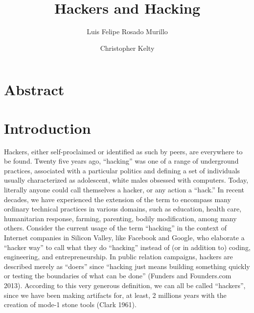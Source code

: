 \documentclass[10pt,letter,oneside]{scrartcl}
\author[1]{Luis Felipe Rosado Murillo}
\author[2]{Christopher Kelty}
\affil[1]{Berkman Center for Internet and Society, Harvard University}
\affil[2]{Institute for Society and Genetics,
          Department of Anthropology, and Department of Information Studies, UCLA}
\title{Hackers and Hacking}
\date{}
\begin{document}
 \maketitle 

\section{Abstract} 

\doublespacing 




\section{Introduction}

Hackers, either self-proclaimed or identified as such by peers,  are everywhere
to be found.  Twenty five years ago, ``hacking'' was one of a range of
underground practices, associated with a particular politics and defining a set
of individuals usually characterized as adolescent, white males obsessed with
computers.  Today, literally anyone could call themselves a hacker, or any
action a ``hack.'' In recent decades, we have experienced the extension of the
term to encompass many ordinary technical practices in various domains, such as
education, health care, humanitarian response, farming, parenting, bodily
modification, among many others.  Consider the current usage of the term
``hacking'' in the context of Internet companies in Silicon Valley, like
Facebook and Google, who elaborate a ``hacker way'' to call what they do
``hacking'' instead of (or in addition to) coding, engineering, and
entrepreneurship.  In public relation campaigns, hackers are described merely
as ``doers'' since ``hacking just means building something quickly or testing
the boundaries of what can be done'' (Funders and Founders.com 2013).
According to this very generous definition, we can all be called ``hackers'',
since we have been making artifacts for, at least, 2 millions years with the
creation of mode-1 stone tools (Clark 1961).
\end{document}
